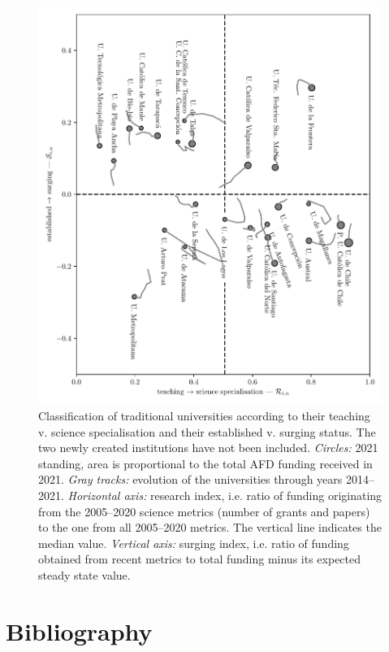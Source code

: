 \documentclass[twocolumn]{article}
\begin{document}
\begin{figure}[p]
\centering
\includegraphics{pdf/afd-specialisation.pdf}
\caption{Classification of traditional universities according to their teaching v. science specialisation and their established v. surging status. The two newly created institutions have not been included. \textit{Circles:} 2021 standing, area is proportional to the total AFD funding received in 2021. \textit{Gray tracks:} evolution of the universities through years 2014--2021. \textit{Horizontal axis:} research index, i.e. ratio of funding originating from the 2005--2020 science metrics (number of grants and papers) to the one from all 2005--2020 metrics. The vertical line indicates the median value. \textit{Vertical axis:} surging index, i.e. ratio of funding obtained from recent metrics to total funding minus its expected steady state value.  }
\end{figure}


\section*{Bibliography}


\end{document}
